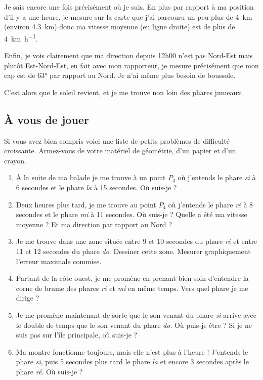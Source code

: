 \documentclass[class=report,crop=false]{standalone}
\begin{document}
Je sais encore une fois précisément où je suis. En plus 
par rapport à ma position d'il y a une heure, je mesure sur la carte
que j'ai parcouru un peu plus de \SI{4}{\kilo \meter}
(environ \SI{4.3}{\kilo \meter}) donc ma vitesse moyenne (en ligne droite)
est de plus de \SI{4}{\kilo \meter \per \hour}.

Enfin, je vois clairement que ma direction depuis 12h00
n'est pas Nord-Est mais plutôt Est-Nord-Est, en fait avec mon rapporteur, je mesure précisément que mon cap est de
\ang{63} par rapport au Nord. Je n'ai même plus besoin de boussole.

C'est alors que le soleil revient, et je me trouve non loin des phares jumeaux.



\subsection{\`A vous de jouer}

Si vous avez bien compris voici une liste de petits problèmes de difficulté croissante.
Armez-vous de votre matériel de géométrie, d'un papier et d'un crayon.


\begin{enumerate}
  \item \`A la suite de ma balade je me trouve à un point $P_3$
  où j'entends le phare \emph{si} à 6 secondes et le phare \emph{la}
  à 15 secondes. Où suis-je ?
  
  \item Deux heures plus tard, je me trouve au point $P_4$ où j'entends le phare
  \emph{ré} à 8 secondes et le phare \emph{mi} à 11 secondes. Où suis-je ?
  Quelle a été ma vitesse moyenne ? Et ma direction par rapport au Nord ?
  
  \item Je me trouve dans une zone située entre 9 et 10 secondes du phare \emph{ré}
  et entre 11 et 12 secondes du phare \emph{do}. Dessiner cette zone. Mesurer graphiquement
  l'erreur maximale commise. 
  
  \item Partant de la côte ouest, je me promène en prenant bien soin 
  d'entendre la corne de brume des phares \emph{ré} et \emph{mi} en même temps.
  Vers quel phare je me dirige ?
  
  \item Je me promène maintenant de sorte que le son venant du phare \emph{si}
  arrive avec le double de temps que le son venant du phare \emph{do}.
  Où puis-je être ? Si je ne suis pas sur l'île principale, où suis-je ?
  
  \item Ma montre fonctionne toujours, mais elle n'est plus à l'heure ! 
  J'entends le phare \emph{si}, puis 5 secondes plus tard le phare \emph{la}
  et encore 3 secondes après le phare \emph{ré}. Où suis-je ?
  
  
\end{enumerate}
\end{document}
